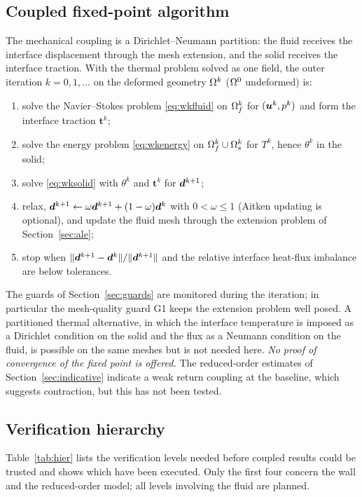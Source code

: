 \subsection{Coupled fixed-point algorithm}
\label{sec:algorithm}
The mechanical coupling is a Dirichlet--Neumann partition: the fluid receives the interface displacement
through the mesh extension, and the solid receives the interface traction. With the thermal problem
solved as one field, the outer iteration $k=0,1,\dots$ on the deformed geometry
$\Omega^k$ ($\Omega^0$ undeformed) is:
\begin{enumerate}
\item solve the Navier--Stokes problem \eqref{eq:wkfluid} on $\Omega_f^k$ for $(\bm{u}^k,p^k)$ and form the
interface traction $\bm t^k$;
\item solve the energy problem \eqref{eq:wkenergy} on $\Omega_f^k\cup\Omega_s^k$ for $T^k$, hence $\theta^k$ in the solid;
\item solve \eqref{eq:wksolid} with $\theta^k$ and $\bm t^k$ for $\bm{d}^{k+1}$;
\item relax, $\bm{d}^{k+1}\leftarrow\omega\bm{d}^{k+1}+(1-\omega)\bm{d}^k$ with $0<\omega\le1$ (Aitken updating is optional), and
update the fluid mesh through the extension problem of Section~\ref{sec:ale};
\item stop when $\|\bm{d}^{k+1}-\bm{d}^k\|/\|\bm{d}^{k+1}\|$ and the relative interface heat-flux imbalance are below tolerances.
\end{enumerate}
The guards of Section~\ref{sec:guards} are monitored during the iteration; in particular the
mesh-quality guard G1 keeps the extension problem well posed. A partitioned thermal alternative, in which
the interface temperature is imposed as a Dirichlet condition on the solid and the flux as a Neumann
condition on the fluid, is possible on the same meshes but is not needed here. \emph{No proof of convergence
of the fixed point is offered.} The reduced-order estimates of Section~\ref{sec:indicative} indicate a weak
return coupling at the baseline, which suggests contraction, but this has not been tested.

\subsection{Verification hierarchy}
\label{sec:hier}
Table~\ref{tab:hier} lists the verification levels needed before coupled results could be trusted and
shows which have been executed. Only the first four concern the wall and the reduced-order model; all
levels involving the fluid are planned.

